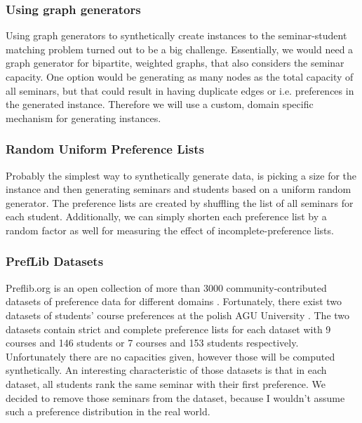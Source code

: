 \subsubsection{Using graph generators}
Using graph generators to synthetically create instances to the seminar-student matching problem turned out to be a big challenge. Essentially, we would need a graph generator for bipartite, weighted graphs, that also considers the seminar capacity. One option would be generating as many nodes as the total capacity of all seminars, but that could result in having duplicate edges or i.e. preferences in the generated instance. Therefore we will use a custom, domain specific mechanism for generating instances.

\subsubsection{Random Uniform Preference Lists}
Probably the simplest way to synthetically generate data, is picking a size for the instance and then generating seminars and students based on a uniform random generator. The preference lists are created by shuffling the list of all seminars for each student. Additionally, we can simply shorten each preference list by a random factor as well for measuring the effect of incomplete-preference lists.

\subsubsection{PrefLib Datasets}
Preflib.org is an open collection of more than 3000 community-contributed datasets of preference data for different domains \cite{PrefLib}. Fortunately, there exist two datasets of students' course preferences at the polish AGU University \cite{preflib-dataset}. The two datasets contain strict and complete preference lists for each dataset with 9 courses and 146 students or 7 courses and 153 students respectively. Unfortunately there are no capacities given, however those will be computed synthetically. An interesting characteristic of those datasets is that in each dataset, all students rank the same seminar with their first preference. We decided to remove those seminars from the dataset, because I wouldn't assume such a preference distribution in the real world.

